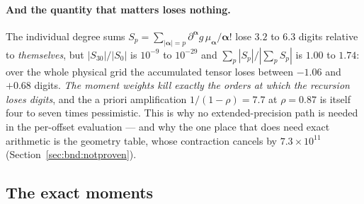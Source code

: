 \paragraph{And the quantity that matters loses nothing.} The individual degree sums
$S_p = \sum_{|\boldsymbol\alpha|=p}\partial^{\boldsymbol\alpha}g\,
\mu_{\boldsymbol\alpha}/\boldsymbol\alpha!$ lose $3.2$ to $6.3$ digits relative to
\emph{themselves}, but $|S_{30}|/|S_0|$ is $10^{-9}$ to $10^{-29}$ and
$\sum_p|S_p|/|\sum_p S_p|$ is $1.00$ to $1.74$: over the whole physical grid the accumulated
tensor loses between $-1.06$ and $+0.68$ digits. \emph{The moment weights kill exactly the
orders at which the recursion loses digits}, and the a priori amplification $1/(1-\rho) =
7.7$ at $\rho = 0.87$ is itself four to seven times pessimistic. This is why no
extended-precision path is needed in the per-offset evaluation --- and why the one place
that does need exact arithmetic is the geometry table, whose contraction cancels by
$7.3\times10^{11}$ (Section~\ref{sec:bnd:notproven}).

\subsection{The exact moments}
\label{sec:grd:mom}

